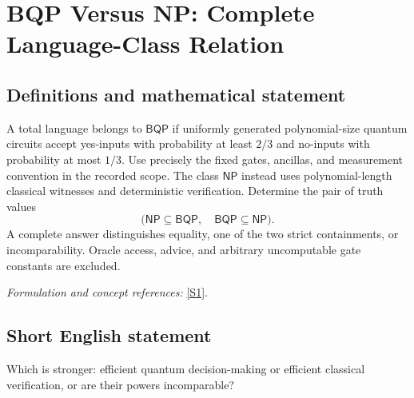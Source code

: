 \documentclass[11pt,a4paper]{article}
\newcommand{\sref}[2]{\hyperlink{source:#1:#2}{[S#2]}}
\newif\ifshowcatalogue
\newcommand{\cataloguescope}[1]{\ifshowcatalogue
 \paragraph{Exact scope in the supplied catalogue.}
 \begin{quote}\small #1\end{quote}\fi}
\begin{document}
\setcounter{section}{0}
\clearpage
\section*{\texorpdfstring{BQP Versus NP: Complete Language-Class Relation}{BQP Versus NP: Complete Language-Class Relation}}\label{statement}
\subsection{Definitions and mathematical statement}
A total language belongs to $\mathsf{BQP}$ if uniformly generated polynomial-size quantum circuits accept yes-inputs with probability at least $2/3$ and no-inputs with probability at most $1/3$. Use precisely the fixed gates, ancillas, and measurement convention in the recorded scope. The class $\mathsf{NP}$ instead uses polynomial-length classical witnesses and deterministic verification. Determine the pair of truth values
\[
 \bigl(\mathsf{NP}\subseteq\mathsf{BQP},\quad
       \mathsf{BQP}\subseteq\mathsf{NP}\bigr).
\]
A complete answer distinguishes equality, one of the two strict containments, or incomparability. Oracle access, advice, and arbitrary uncomputable gate constants are excluded.
\par\smallskip\textit{Formulation and concept references:} \sref{statement}{1}.
\cataloguescope{Determine the truth values of BOTH NP subseteq BQP and BQP subseteq NP for unrelativized, advice-free classes of total languages over \{0,1\}. NP consists of languages with polynomial-length binary witnesses and a deterministic polynomial-time verifier. BQP consists of languages decided by polynomial-time uniformly generated polynomial-size quantum circuits (a deterministic Turing machine outputs Q\_n on 1\textasciicircum{}n), using Watrous's fixed Toffoli, Hadamard and phase-i gates with |0> ancillas and discarding, followed by a standard-basis output measurement. On every yes input acceptance is at least 2/3, and on every no input it is at most 1/3. No arbitrary real gate constants, advice or oracle are available. Establish equality, either proper containment, or incomparability.}
\subsection{Short English statement}
Which is stronger: efficient quantum decision-making or efficient classical verification, or are their powers incomparable?
\end{document}
